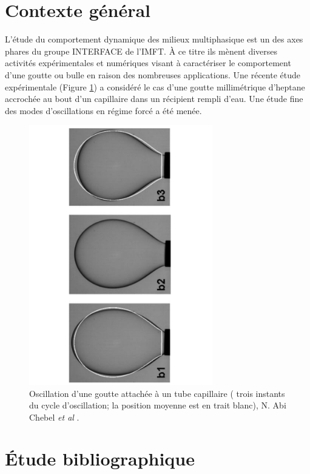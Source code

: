 \documentclass[a4paper]{report}
\begin{document}
\section{Contexte général}
L'étude du comportement dynamique des milieux multiphasique est un des axes phares du groupe INTERFACE de l'IMFT.
À ce titre ils mènent diverses activités expérimentales et numériques visant à caractériser le comportement d'une goutte ou bulle en raison des nombreuses applications.
Une récente étude expérimentale (Figure \ref{title}) a considéré le cas d'une goutte millimétrique d'heptane accrochée au bout d'un capillaire dans un récipient rempli d'eau. Une étude fine des modes d'oscillations en régime forcé a été menée.
\begin{figure}[h!] 
\begin{center}
\includegraphics[width=8cm, angle=270]{title.pdf}
\caption{Oscillation d'une goutte attachée à un tube capillaire ( trois instants du cycle d'oscillation; la position moyenne est en trait blanc), N. Abi Chebel \textsl{et al} \cite{3}.}
\label{title}
\end{center}
\end{figure} 
\newpage
\section{Étude bibliographique}
\end{document}
